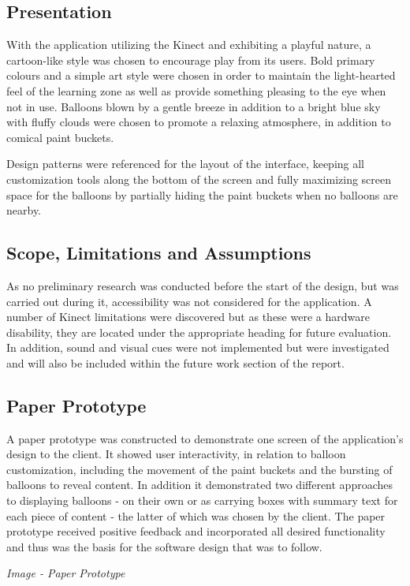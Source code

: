 \subsection{Presentation}
With the application utilizing the Kinect and exhibiting a playful nature, a cartoon-like style was chosen to encourage play from its users. Bold primary colours and a simple art style were chosen in order to maintain the light-hearted feel of the learning zone as well as provide something pleasing to the eye when not in use. Balloons blown by a gentle breeze in addition to a bright blue sky with fluffy clouds were chosen to promote a relaxing atmosphere, in addition to comical paint buckets.

Design patterns were referenced for the layout of the interface, keeping all customization tools along the bottom of the screen and fully maximizing screen space for the balloons by partially hiding the paint buckets when no balloons are nearby. 

\subsection{Scope, Limitations and Assumptions}
As no preliminary research was conducted before the start of the design, but was carried out during it, accessibility was not considered for the application. A number of Kinect limitations were discovered but as these were a hardware disability, they are located under the appropriate heading for future evaluation. In addition, sound and visual cues were not implemented but were investigated and will also be included within the future work section of the report.

\subsection{Paper Prototype}
A paper prototype was constructed to demonstrate one screen of the application's design to the client. It showed user interactivity, in relation to balloon customization, including the movement of the paint buckets and the bursting of balloons to reveal content. In addition it demonstrated two different approaches to displaying balloons - on their own or as carrying boxes with summary text for each piece of content - the latter of which was chosen by the client. The paper prototype received positive feedback and incorporated all desired functionality and thus was the basis for the software design that was to follow.

\begin{center}
\textit{Image - Paper Prototype}
\end{center}
